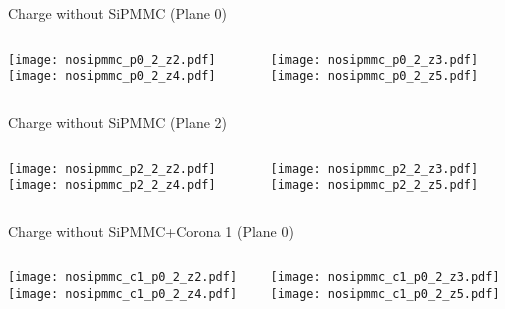 \documentclass{beamer}
\begin{document}
\begin{frame}{Charge without SiPMMC (Plane 0)}
	\begin{columns}[onlytextwidth]
		\begin{column}{0.5\textwidth}
			\texttt{[image: nosipmmc\_p0\_2\_z2.pdf]} \\
			\texttt{[image: nosipmmc\_p0\_2\_z4.pdf]}
		 \end{column}
		 \begin{column}{0.5\textwidth}
			\texttt{[image: nosipmmc\_p0\_2\_z3.pdf]} \\
			\texttt{[image: nosipmmc\_p0\_2\_z5.pdf]}
		 \end{column}
 \end{columns}
\end{frame}

\begin{frame}{Charge without SiPMMC (Plane 2)}
	\begin{columns}[onlytextwidth]
		\begin{column}{0.5\textwidth}
			\texttt{[image: nosipmmc\_p2\_2\_z2.pdf]} \\
			\texttt{[image: nosipmmc\_p2\_2\_z4.pdf]}
		 \end{column}
		 \begin{column}{0.5\textwidth}
			\texttt{[image: nosipmmc\_p2\_2\_z3.pdf]} \\
			\texttt{[image: nosipmmc\_p2\_2\_z5.pdf]}
		 \end{column}
 \end{columns}
\end{frame}


\begin{frame}{Charge without SiPMMC+Corona 1 (Plane 0)}
	\begin{columns}[onlytextwidth]
		\begin{column}{0.5\textwidth}
			\texttt{[image: nosipmmc\_c1\_p0\_2\_z2.pdf]} \\
			\texttt{[image: nosipmmc\_c1\_p0\_2\_z4.pdf]}
		 \end{column}
		 \begin{column}{0.5\textwidth}
			\texttt{[image: nosipmmc\_c1\_p0\_2\_z3.pdf]} \\
			\texttt{[image: nosipmmc\_c1\_p0\_2\_z5.pdf]}
		 \end{column}
 \end{columns}
\end{frame}
\end{document}

